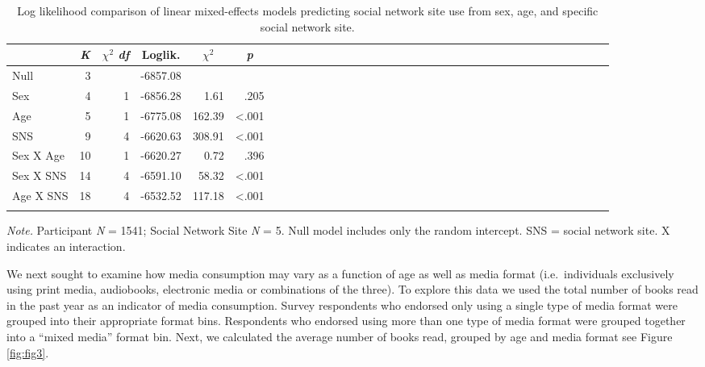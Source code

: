 \documentclass[man, fleqn, noextraspace]{apa6}
\theoremstyle{definition}
\theoremstyle{definition}
\theoremstyle{definition}
\theoremstyle{remark}
\begin{document}
\begin{table}[tbp]
\begin{center}
\begin{threeparttable}
\caption{\label{tab:df_lmer_table}Log likelihood comparison of linear mixed-effects models predicting social network site use from sex, age, and specific social network site.}
\begin{tabular}{lrrrrrlrrrrrlrrrrrlrrrrrlrrrrrlrrrrr}
\toprule
 & \multicolumn{1}{c}{\textit{K}} & \multicolumn{1}{c}{$\chi^2$ \textit{df}} & \multicolumn{1}{c}{Loglik.} & \multicolumn{1}{c}{$\chi^2$} & \multicolumn{1}{c}{\textit{p}}\\
\midrule
Null & 3 &  & -6857.08 &  & \\
Sex & 4 & 1 & -6856.28 & 1.61 & .205\\
Age & 5 & 1 & -6775.08 & 162.39 & <.001\\
SNS & 9 & 4 & -6620.63 & 308.91 & <.001\\
Sex X Age & 10 & 1 & -6620.27 & 0.72 & .396\\
Sex X SNS & 14 & 4 & -6591.10 & 58.32 & <.001\\
Age X SNS & 18 & 4 & -6532.52 & 117.18 & <.001\\
\bottomrule
\addlinespace
\end{tabular}
\begin{tablenotes}[para]
\normalsize{\textit{Note.} Participant \textit{N} = 1541; Social Network Site \textit{N} = 5. Null model includes only the random intercept. SNS = social network site. X indicates an interaction.}
\end{tablenotes}
\end{threeparttable}
\end{center}
\end{table}

We next sought to examine how media consumption may vary as a function
of age as well as media format (i.e.~individuals exclusively using print
media, audiobooks, electronic media or combinations of the three). To
explore this data we used the total number of books read in the past
year as an indicator of media consumption. Survey respondents who
endorsed only using a single type of media format were grouped into
their appropriate format bins. Respondents who endorsed using more than
one type of media format were grouped together into a \enquote{mixed
media} format bin. Next, we calculated the average number of books read,
grouped by age and media format see Figure \ref{fig:fig3}.
\end{document}
